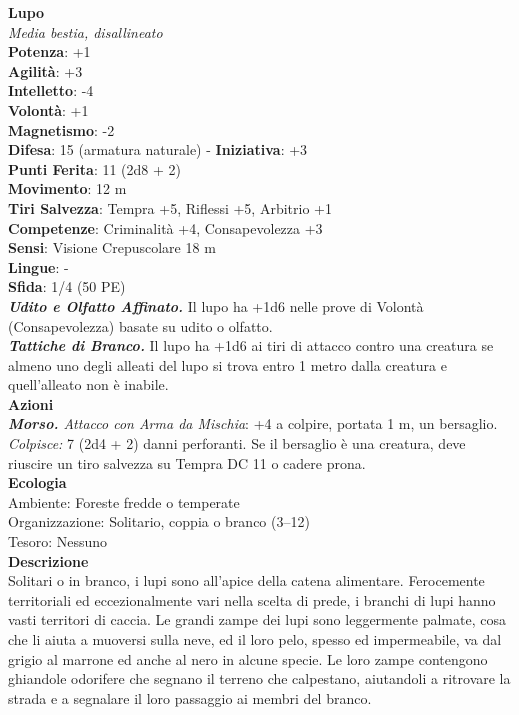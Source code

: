 \begin{multicols}{2}
\medskip\textbf{Lupo}\\
\emph{Media bestia, disallineato}\\
\textbf{Potenza}: +1\\
\textbf{Agilità}: +3\\
\textbf{Intelletto}: -4\\
\textbf{Volontà}: +1\\
\textbf{Magnetismo}: -2\\
\textbf{Difesa}: 15 (armatura naturale) - \textbf{Iniziativa}: +3\\
\textbf{Punti Ferita}: 11 (2d8 + 2)\\
\textbf{Movimento}: 12 m\\
\textbf{Tiri Salvezza}: Tempra +5, Riflessi +5, Arbitrio +1 \\
\textbf{Competenze}: Criminalità +4, Consapevolezza +3\\
\textbf{Sensi}: Visione Crepuscolare 18 m\\
\textbf{Lingue}: -\\
\textbf{Sfida}: 1/4 (50 PE)\smallskip\\
\emph{\textbf{Udito e Olfatto Affinato.}} Il lupo ha +1d6 nelle prove di Volontà (Consapevolezza) basate su udito o olfatto.\\
\emph{\textbf{Tattiche di Branco.}} Il lupo ha +1d6 ai tiri di attacco contro una creatura se almeno uno degli alleati del lupo si trova entro 1 metro dalla creatura e quell'alleato non è inabile.\\
\smallskip\textbf{Azioni}\\
\emph{\textbf{Morso.} Attacco con Arma da Mischia}: +4 a colpire, portata 1 m, un bersaglio.\\

\emph{Colpisce:} 7 (2d4 + 2) danni perforanti. Se il bersaglio è una creatura, deve riuscire un tiro salvezza su Tempra DC 11 o cadere prona.\\
\textbf{Ecologia}\\
Ambiente: Foreste fredde o temperate\\
Organizzazione: Solitario, coppia o branco (3–12)\\
Tesoro: Nessuno\\
\textbf{Descrizione}\\

Solitari o in branco, i lupi sono all’apice della catena alimentare. Ferocemente territoriali ed eccezionalmente vari nella scelta di prede, i branchi di lupi hanno vasti territori di caccia. Le grandi zampe dei lupi sono leggermente palmate, cosa che li aiuta a muoversi sulla neve, ed il loro pelo, spesso ed impermeabile, va dal grigio al marrone ed anche al nero in alcune specie. Le loro zampe contengono ghiandole odorifere che segnano il terreno che calpestano, aiutandoli a ritrovare la strada e a segnalare il loro passaggio ai membri del branco.\\


\end{multicols}
